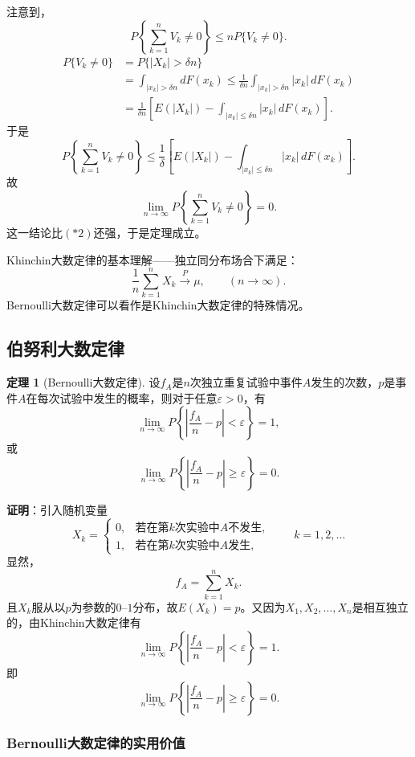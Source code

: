 \documentclass[11pt,a4paper]{report}
\theoremstyle{definition}
\newtheorem{theorem}{定理}[chapter]
\begin{document}
注意到，
\[
P\left\{\sum_{k=1}^{n}V_{k}\neq0\right\}\leq nP\{V_{k}\neq0\}.
\]
\begin{align*}
P\{V_{k}\neq0\}&=P\{|X_{k}|>\delta n\}\\
&=\int_{|x_{k}|>\delta n}dF(x_{k})\leq\frac{1}{\delta n}\int_{|x_{k}|>\delta n}|x_{k}|\,dF(x_{k})\\
&=\frac{1}{\delta n}\left[E(|X_{k}|)-\int_{|x_{k}|\leq\delta n}|x_{k}|\,dF(x_{k})\right].
\end{align*}
于是
\[
P\left\{\sum_{k=1}^{n}V_{k}\neq0\right\}\leq\frac{1}{\delta}\left[E(|X_{k}|)-\int_{|x_{k}|\leq\delta n}|x_{k}|\,dF(x_{k})\right].
\]
故
\[
\lim_{n\to\infty}P\left\{\sum_{k=1}^{n}V_{k}\neq0\right\}=0.
\]
这一结论比$(*2)$还强，于是定理成立。

Khinchin大数定律的基本理解——独立同分布场合下满足：
\[
\frac{1}{n}\sum_{k=1}^{n}X_{k}\stackrel{P}{\rightarrow}\mu,\qquad(n\to\infty).
\]
Bernoulli大数定律可以看作是Khinchin大数定律的特殊情况。

\subsection{伯努利大数定律}

\begin{theorem}[Bernoulli大数定律]
设$f_{A}$是$n$次独立重复试验中事件$A$发生的次数，$p$是事件$A$在每次试验中发生的概率，则对于任意$\varepsilon>0$，有
\[
\lim_{n\to\infty}P\left\{\left|\frac{f_{A}}{n}-p\right|<\varepsilon\right\}=1,
\]
或
\[
\lim_{n\to\infty}P\left\{\left|\frac{f_{A}}{n}-p\right|\geq\varepsilon\right\}=0.
\]
\end{theorem}

\textbf{证明}：引入随机变量
\[
X_{k}=
\begin{cases}
0, & \text{若在第}k\text{次实验中}A\text{不发生},\\[0.3em]
1, & \text{若在第}k\text{次实验中}A\text{发生},
\end{cases}
\qquad k=1,2,\ldots
\]
显然，
\[
f_{A}=\sum_{k=1}^{n}X_{k}.
\]
且$X_{k}$服从以$p$为参数的$0$--$1$分布，故$E(X_{k})=p$。又因为$X_{1},X_{2},\ldots,X_{n}$是相互独立的，由Khinchin大数定律有
\[
\lim_{n\to\infty}P\left\{\left|\frac{f_{A}}{n}-p\right|<\varepsilon\right\}=1.
\]
即
\[
\lim_{n\to\infty}P\left\{\left|\frac{f_{A}}{n}-p\right|\geq\varepsilon\right\}=0.
\]

\subsubsection*{Bernoulli大数定律的实用价值}
\end{document}
